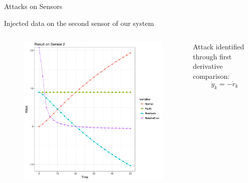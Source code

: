 \documentclass{beamer}
\begin{document}
\begin{frame}{Attacks on Sensors}

	\alert{Injected data on the second sensor of our system}

	\begin{columns}
		\begin{column}{0.5\textwidth}
			\begin{figure}
				\includegraphics[width=\textwidth]{attack_sensor2_2}
				\label{fig:attack_valve}
			\end{figure}
		\end{column}

		\begin{column}{0.5\textwidth}
			\alert{Attack identified through first derivative comparison:
				\[ \dot{y}_k=-\dot{r}_k \]
			}
		\end{column}
	\end{columns}

\end{frame}
\end{document}
